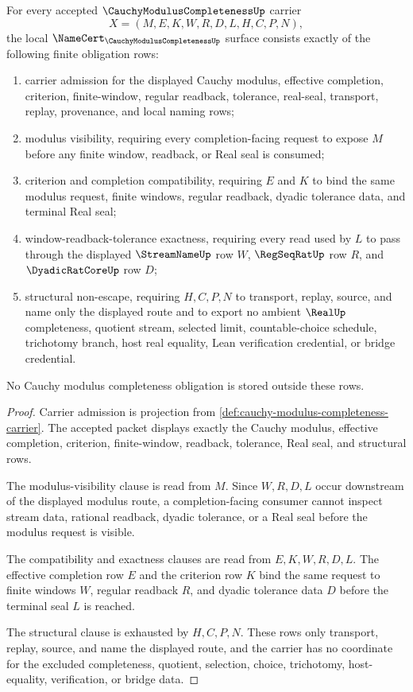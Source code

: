 \begin{theorem}
\label{thm:cauchy-modulus-completeness-namecert-obligations}
For every accepted $\CauchyModulusCompletenessUp$ carrier
$$
X=(M,E,K,W,R,D,L,H,C,P,N),
$$
the local $\NameCert_{\CauchyModulusCompletenessUp}$ surface consists exactly of the following finite obligation rows:
\begin{enumerate}
\item carrier admission for the displayed Cauchy modulus, effective completion, criterion, finite-window, regular readback, tolerance, real-seal, transport, replay, provenance, and local naming rows;
\item modulus visibility, requiring every completion-facing request to expose $M$ before any finite window, readback, or Real seal is consumed;
\item criterion and completion compatibility, requiring $E$ and $K$ to bind the same modulus request, finite windows, regular readback, dyadic tolerance data, and terminal Real seal;
\item window-readback-tolerance exactness, requiring every read used by $L$ to pass through the displayed $\StreamNameUp$ row $W$, $\RegSeqRatUp$ row $R$, and $\DyadicRatCoreUp$ row $D$;
\item structural non-escape, requiring $H,C,P,N$ to transport, replay, source, and name only the displayed route and to export no ambient $\RealUp$ completeness, quotient stream, selected limit, countable-choice schedule, trichotomy branch, host real equality, Lean verification credential, or bridge credential.
\end{enumerate}
No Cauchy modulus completeness obligation is stored outside these rows.
\end{theorem}
\begin{proof}
Carrier admission is projection from \autoref{def:cauchy-modulus-completeness-carrier}. The accepted packet displays exactly the Cauchy modulus, effective completion, criterion, finite-window, readback, tolerance, Real seal, and structural rows.

The modulus-visibility clause is read from $M$. Since $W,R,D,L$ occur downstream of the displayed modulus route, a completion-facing consumer cannot inspect stream data, rational readback, dyadic tolerance, or a Real seal before the modulus request is visible.

The compatibility and exactness clauses are read from $E,K,W,R,D,L$. The effective completion row $E$ and the criterion row $K$ bind the same request to finite windows $W$, regular readback $R$, and dyadic tolerance data $D$ before the terminal seal $L$ is reached.

The structural clause is exhausted by $H,C,P,N$. These rows only transport, replay, source, and name the displayed route, and the carrier has no coordinate for the excluded completeness, quotient, selection, choice, trichotomy, host-equality, verification, or bridge data.
\end{proof}

